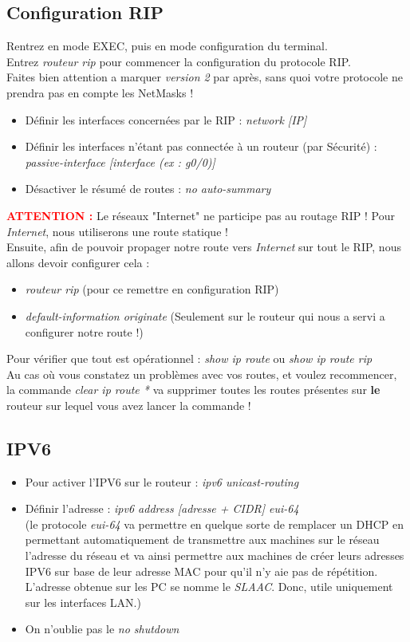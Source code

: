 \documentclass[a4paper]{article}
\begin{document}
\subsection{Configuration RIP}
Rentrez en mode EXEC, puis en mode configuration du terminal.\\
Entrez \emph{routeur rip} pour commencer la configuration du protocole RIP.\\
Faites bien attention a marquer \emph{version 2} par après, sans quoi votre protocole ne prendra pas en 
compte les NetMasks !\\
\begin{itemize}
  \item Définir les interfaces concernées par le RIP : \emph{network [IP]}
  \item Définir les interfaces n'étant pas connectée à un routeur (par Sécurité) : \emph{passive-interface [interface (ex : g0/0)]}
  \item Désactiver le résumé de routes : \emph{no auto-summary}
\end{itemize}
\textcolor{red}{\textbf{ATTENTION :}} Le réseaux "Internet" ne participe pas au routage RIP !
Pour \emph{Internet}, nous utiliserons une route statique !\\
Ensuite, afin de pouvoir propager notre route vers \emph{Internet} sur tout le RIP, nous allons devoir configurer cela :
\begin{itemize}
  \item \emph{routeur rip} (pour ce remettre en configuration RIP)
  \item \emph{default-information originate} (Seulement sur le routeur qui nous a servi a configurer notre route !)
\end{itemize}
Pour vérifier que tout est opérationnel : \emph{show ip route} ou \emph{show ip route rip}\\
Au cas où vous constatez un problèmes avec vos routes, et voulez recommencer, la commande \emph{clear ip route *} va supprimer 
toutes les routes présentes sur \textbf{le} routeur sur lequel vous avez lancer la commande !

\subsection{IPV6}
\begin{itemize}
  \item Pour activer l'IPV6 sur le routeur : \emph{ipv6 unicast-routing}
  \item Définir l'adresse : \emph{ipv6 address [adresse + CIDR] eui-64}\\
  (le protocole \emph{eui-64} va permettre en quelque sorte de remplacer 
  un DHCP en permettant automatiquement de transmettre aux machines sur le réseau l'adresse du réseau et va ainsi permettre aux machines de créer leurs
  adresses IPV6 sur base de leur adresse MAC pour qu'il n'y aie pas de répétition. L'adresse obtenue sur les PC se nomme le \emph{SLAAC}. Donc, utile uniquement sur les interfaces LAN.)
  \item On n'oublie pas le \emph{no shutdown} 
\end{itemize}
\end{document}
